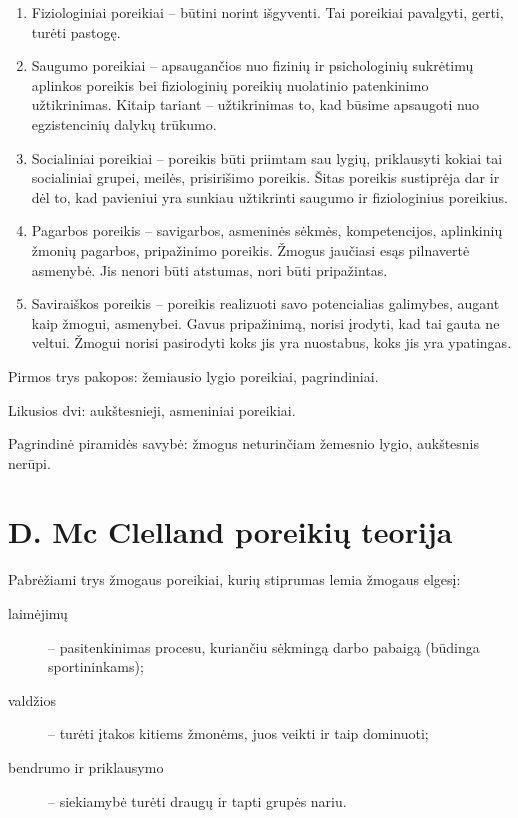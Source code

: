 \begin{enumerate}
  \item Fiziologiniai poreikiai – būtini norint išgyventi. Tai poreikiai
    pavalgyti, gerti, turėti pastogę.
  \item Saugumo poreikiai – apsaugančios nuo fizinių ir psichologinių
    sukrėtimų aplinkos poreikis bei fiziologinių poreikių nuolatinio
    patenkinimo užtikrinimas. Kitaip tariant – užtikrinimas to, kad
    būsime apsaugoti nuo egzistencinių dalykų trūkumo.
  \item Socialiniai poreikiai – poreikis būti priimtam sau lygių,
    priklausyti kokiai tai socialiniai grupei, meilės, prisirišimo
    poreikis. Šitas poreikis sustiprėja dar ir dėl to, kad pavieniui
    yra sunkiau užtikrinti saugumo ir fiziologinius poreikius.
  \item Pagarbos poreikis – savigarbos, asmeninės sėkmės, kompetencijos,
    aplinkinių žmonių pagarbos, pripažinimo poreikis. Žmogus jaučiasi
    esąs pilnavertė asmenybė. Jis nenori būti atstumas, nori būti
    pripažintas.
  \item Saviraiškos poreikis – poreikis realizuoti savo potencialias
    galimybes, augant kaip žmogui, asmenybei. Gavus pripažinimą, norisi
    įrodyti, kad tai gauta ne veltui. Žmogui norisi pasirodyti koks
    jis yra nuostabus, koks jis yra ypatingas.
\end{enumerate}

Pirmos trys pakopos: žemiausio lygio poreikiai, pagrindiniai.

Likusios dvi: aukštesnieji, asmeniniai poreikiai.

Pagrindinė piramidės savybė: žmogus neturinčiam žemesnio lygio, aukštesnis
nerūpi.

\section{D. Mc Clelland poreikių teorija}

Pabrėžiami trys žmogaus poreikiai, kurių stiprumas lemia žmogaus elgesį:
\begin{description}
  \item[laimėjimų] – pasitenkinimas procesu, kuriančiu sėkmingą darbo
    pabaigą (būdinga sportininkams);
  \item[valdžios] – turėti įtakos kitiems žmonėms, juos veikti ir
    taip dominuoti;
  \item[bendrumo ir priklausymo] – siekiamybė turėti draugų ir tapti
    grupės nariu.
\end{description}


